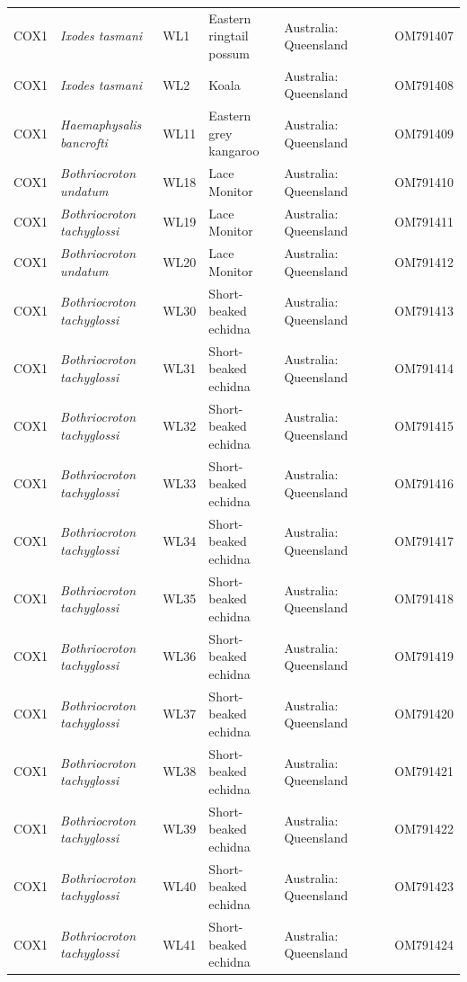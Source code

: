 \documentclass[a4paper, nobind]{templates/ociamthesis}
\begin{document}
\begin{landscape}
\begin{longtable}[t]{l>{}lllllll}
COX1 & \em{Ixodes tasmani} & WL1 & Eastern ringtail possum & Australia: Queensland &  &  & OM791407\\
COX1 & \em{Ixodes tasmani} & WL2 & Koala & Australia: Queensland &  &  & OM791408\\
COX1 & \em{Haemaphysalis bancrofti} & WL11 & Eastern grey kangaroo & Australia: Queensland &  &  & OM791409\\
COX1 & \em{Bothriocroton undatum} & WL18 & Lace Monitor & Australia: Queensland &  &  & OM791410\\
COX1 & \em{Bothriocroton tachyglossi} & WL19 & Lace Monitor & Australia: Queensland &  &  & OM791411\\
COX1 & \em{Bothriocroton undatum} & WL20 & Lace Monitor & Australia: Queensland &  &  & OM791412\\
COX1 & \em{Bothriocroton tachyglossi} & WL30 & Short-beaked echidna & Australia: Queensland &  &  & OM791413\\
COX1 & \em{Bothriocroton tachyglossi} & WL31 & Short-beaked echidna & Australia: Queensland &  &  & OM791414\\
COX1 & \em{Bothriocroton tachyglossi} & WL32 & Short-beaked echidna & Australia: Queensland &  &  & OM791415\\
COX1 & \em{Bothriocroton tachyglossi} & WL33 & Short-beaked echidna & Australia: Queensland &  &  & OM791416\\
COX1 & \em{Bothriocroton tachyglossi} & WL34 & Short-beaked echidna & Australia: Queensland &  &  & OM791417\\
COX1 & \em{Bothriocroton tachyglossi} & WL35 & Short-beaked echidna & Australia: Queensland &  &  & OM791418\\
COX1 & \em{Bothriocroton tachyglossi} & WL36 & Short-beaked echidna & Australia: Queensland &  &  & OM791419\\
COX1 & \em{Bothriocroton tachyglossi} & WL37 & Short-beaked echidna & Australia: Queensland &  &  & OM791420\\
COX1 & \em{Bothriocroton tachyglossi} & WL38 & Short-beaked echidna & Australia: Queensland &  &  & OM791421\\
COX1 & \em{Bothriocroton tachyglossi} & WL39 & Short-beaked echidna & Australia: Queensland &  &  & OM791422\\
COX1 & \em{Bothriocroton tachyglossi} & WL40 & Short-beaked echidna & Australia: Queensland &  &  & OM791423\\
COX1 & \em{Bothriocroton tachyglossi} & WL41 & Short-beaked echidna & Australia: Queensland &  &  & OM791424\\

\end{longtable}
\end{landscape}
\end{document}
